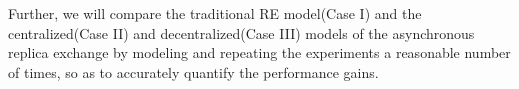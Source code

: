 \documentclass[a4paper,10pt]{article}
\newcommand{\jhanote}[1]{ {\textcolor{red} { ***shantenu: #1 }}}
\newcommand{\athotanote}[1]{ {\textcolor{green} { ***athota: #1 }}}
\newcommand{\jhanote}[1]{}
\newcommand{\athotanote}[1]{}
\begin{document}
Further, we will compare the traditional RE model(Case I) and the centralized(Case II) and decentralized(Case III) models of the asynchronous replica exchange by modeling and repeating the experiments a reasonable number of times, so as to accurately quantify the performance gains.


 
  
 
\end{document}
